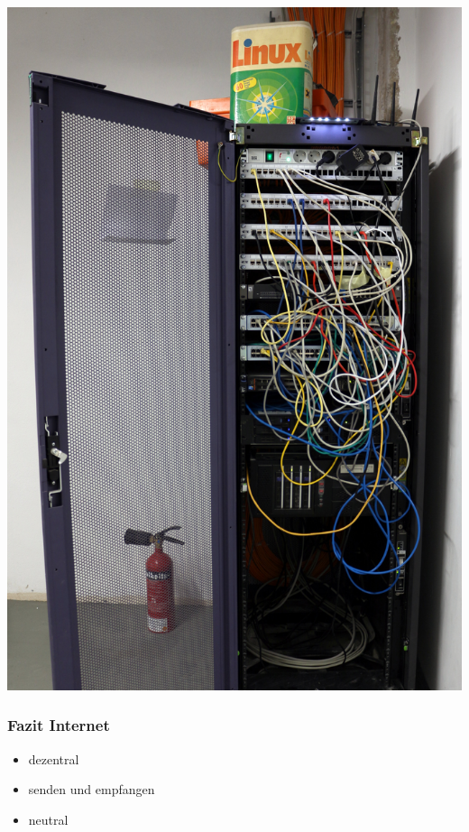 \documentclass[12pt]{beamer}
\begin{document}
\begin{frame}
\begin{center}
{			\includegraphics[height=0.6\textheight]{img/rack.jpg}
		}
	\end{center}
\end{frame}

\begin{frame}
	\frametitle{Fazit Internet}
	\begin{itemize}
		\item<1-> dezentral
		\item<2-> senden und empfangen
    \item<3-> neutral
	\end{itemize}
\end{frame}
\end{document}
